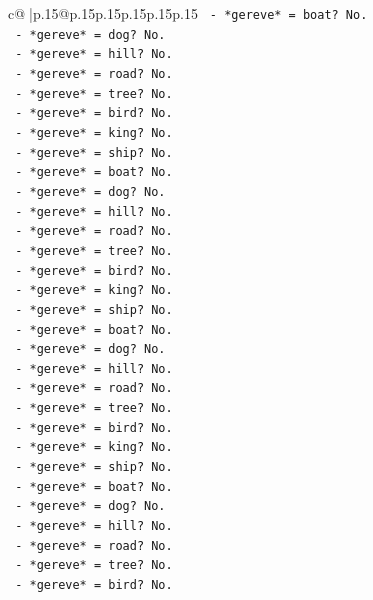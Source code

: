 \documentclass{article}
\begin{document}
{\begin{supertabular}{c@{$\;$}|p{.15\linewidth}@{}p{.15\linewidth}p{.15\linewidth}p{.15\linewidth}p{.15\linewidth}p{.15\linewidth}}
{{{\texttt{            {-} *gereve* = boat? No.} \\
\texttt{            {-} *gereve* = dog? No.} \\
\texttt{            {-} *gereve* = hill? No.} \\
\texttt{            {-} *gereve* = road? No.} \\
\texttt{            {-} *gereve* = tree? No.} \\
\texttt{            {-} *gereve* = bird? No.} \\
\texttt{            {-} *gereve* = king? No.} \\
\texttt{            {-} *gereve* = ship? No.} \\
\texttt{            {-} *gereve* = boat? No.} \\
\texttt{            {-} *gereve* = dog? No.} \\
\texttt{            {-} *gereve* = hill? No.} \\
\texttt{            {-} *gereve* = road? No.} \\
\texttt{            {-} *gereve* = tree? No.} \\
\texttt{            {-} *gereve* = bird? No.} \\
\texttt{            {-} *gereve* = king? No.} \\
\texttt{            {-} *gereve* = ship? No.} \\
\texttt{            {-} *gereve* = boat? No.} \\
\texttt{            {-} *gereve* = dog? No.} \\
\texttt{            {-} *gereve* = hill? No.} \\
\texttt{            {-} *gereve* = road? No.} \\
\texttt{            {-} *gereve* = tree? No.} \\
\texttt{            {-} *gereve* = bird? No.} \\
\texttt{            {-} *gereve* = king? No.} \\
\texttt{            {-} *gereve* = ship? No.} \\
\texttt{            {-} *gereve* = boat? No.} \\
\texttt{            {-} *gereve* = dog? No.} \\
\texttt{            {-} *gereve* = hill? No.} \\
\texttt{            {-} *gereve* = road? No.} \\
\texttt{            {-} *gereve* = tree? No.} \\
\texttt{            {-} *gereve* = bird? No.} \\
}}}
\end{supertabular}}
\end{document}
